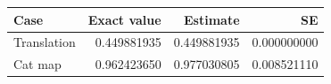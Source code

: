\begin{tabular}{lrrr}
\toprule
Case & Exact value & Estimate & SE\\
\midrule
Translation & 0.449881935 & 0.449881935 & 0.000000000\\
Cat map & 0.962423650 & 0.977030805 & 0.008521110\\
\bottomrule
\end{tabular}
